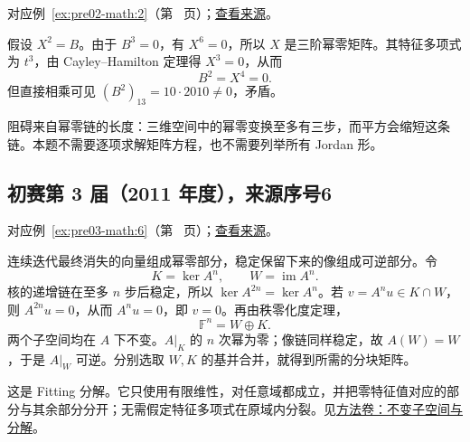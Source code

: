 \documentclass[12pt,fontset=fandol]{ctexart}
\begin{document}
对应例~\ref{ex:pre02-math:2}（第~\pageref{ex:pre02-math:2} 页）；\href{https://github.com/lzxcr/cmc-mathematics/blob/64916fa1fdbc3e444a652eca204d5669058ee321/src/problems/preliminary/02/02.md}{查看来源}。

\begin{solve}

假设 $X^2=B$。由于 $B^3=0$，有 $X^6=0$，所以 $X$ 是三阶幂零矩阵。其特征多项式为 $t^3$，由 Cayley--Hamilton 定理得 $X^3=0$，从而
\[
B^2=X^4=0.
\]
但直接相乘可见 $(B^2)_{13}=10\cdot2010\ne0$，矛盾。

\end{solve}

\begin{remark}[方法与条件]

阻碍来自幂零链的长度：三维空间中的幂零变换至多有三步，而平方会缩短这条链。本题不需要逐项求解矩阵方程，也不需要列举所有 Jordan 形。

\end{remark}

\subsection{初赛第 3 届（2011 年度），来源序号6}\label{ans:pre03-math:6}\label{pr:pre03-math:6}

对应例~\ref{ex:pre03-math:6}（第~\pageref{ex:pre03-math:6} 页）；\href{https://github.com/lzxcr/cmc-mathematics/blob/64916fa1fdbc3e444a652eca204d5669058ee321/src/problems/preliminary/03/06.md}{查看来源}。

\begin{solve}

连续迭代最终消失的向量组成幂零部分，稳定保留下来的像组成可逆部分。令
\[
K=\ker A^n,\qquad W=\operatorname{im}A^n.
\]
核的递增链在至多 $n$ 步后稳定，所以 $\ker A^{2n}=\ker A^n$。若 $v=A^nu\in K\cap W$，则 $A^{2n}u=0$，从而 $A^nu=0$，即 $v=0$。再由秩零化度定理，
\[
\mathbb F^n=W\oplus K.
\]
两个子空间均在 $A$ 下不变。$A|_K$ 的 $n$ 次幂为零；像链同样稳定，故 $A(W)=W$，于是 $A|_W$ 可逆。分别选取 $W,K$ 的基并合并，就得到所需的分块矩阵。

\end{solve}

\begin{remark}[方法与条件]

这是 Fitting 分解。它只使用有限维性，对任意域都成立，并把零特征值对应的部分与其余部分分开；无需假定特征多项式在原域内分裂。见\hyperref[app:linear-invariant]{方法卷：不变子空间与分解}。

\end{remark}
\end{document}
